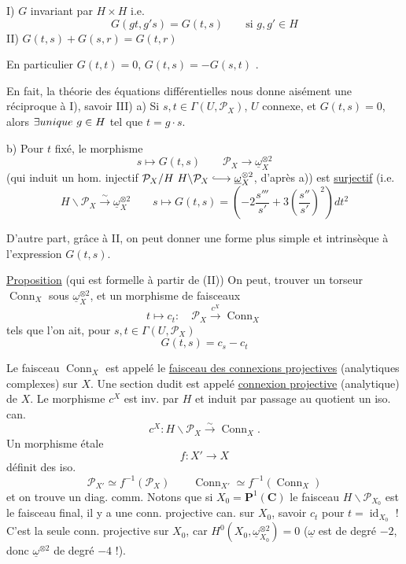 I) $G$ invariant par $H\times H$ i.e.
\[
G(gt,g's)=G(t,s)\qquad\text{si }g,g'\in H
\]
II) $G(t,s)+G(s,r)=G(t,r)$

En particulier $G(t,t)=0$, $G(t,s)=-G(s,t)$ .

En fait, la théorie des équations différentielles nous donne aisément une réciproque à I), savoir
III) a) Si $s,t\in\Gamma(U,\mathcal P_X)$, $U$ connexe,  et $G(t,s)=0$, alors $\exists{{unique}}\ g\in H$ tel que $t=g\cdot s$.

b) Pour $t$ fixé, le morphisme
\[
s\longmapsto G(t,s)\qquad \mathcal P_X\longrightarrow\underline\omega_X^{\otimes2}
\]
(qui induit un hom. injectif $\deleted{\unsure{\mathcal P_X/H}}\ H\backslash\mathcal P_X\lhook\joinrel\longrightarrow\underline\omega_X^{\otimes2}$, d'après a)) est \uline{surjectif} (i.e.
\[
H\backslash\mathcal P_X\xrightarrow{\sim}\underline\omega_X^{\otimes2}\qquad s\longmapsto G(t,s)=\left(-2\frac{s'''}{s'}+3\left(\frac{s''}{s'}\right)^2\right)dt^2
\]

D'autre part, grâce à II, on peut donner une forme plus simple et intrinsèque à l'expression $G(t,s)$.

\uline{Proposition} (qui est formelle à partir de (II)) On peut,  trouver un torseur $\operatorname{Conn}_X$ sous $\underline\omega_X^{\otimes2}$, et un morphisme de faisceaux
\[
t\longmapsto c_t:\quad\mathcal P_X\xrightarrow{c^X}\operatorname{Conn}_X
\]
tels que l'on ait, pour $s,t\in\Gamma(U,\mathcal P_X)$
\[
\boxed{G(t,s)=c_s-c_t}
\]

\margin{!}
Le faisceau $\operatorname{Conn}_X$ est appelé le \uline{faisceau des connexions projectives} (analytiques complexes) sur $X$. Une section dudit est appelé \uline{connexion projective} (analytique) de $X$. Le morphisme $c^X$ est inv. par $H$ et induit par passage au quotient un iso. can.
\[
c^X:H\backslash\mathcal P_X\xrightarrow{\sim}\operatorname{Conn}_X.
\]
Un morphisme étale
\[
f:X'\longrightarrow X
\]
définit des iso.
\[
\mathcal P_{X'}\simeq f^{-1}(\mathcal P_X)\qquad \operatorname{Conn}_{X'}\simeq f^{-1}(\operatorname{Conn}_X)
\]
et on trouve un  diag. comm.
Notons que si $X_0=\mathbf P^1(\mathbf C)$  le faisceau $H\backslash\mathcal P_{X_0}$ est le faisceau final,   il y a une conn. projective can.  sur $X_0$, savoir $c_t$ pour $t=\operatorname{id}_{X_0}$ ! C'est la seule conn. projective sur $X_0$, car $H^0(X_0,\underline\omega_{X_0}^{\otimes2})=0$ ($\underline\omega$ est de degré $-2$, donc $\underline\omega^{\otimes2}$ de degré $-4$ !).

